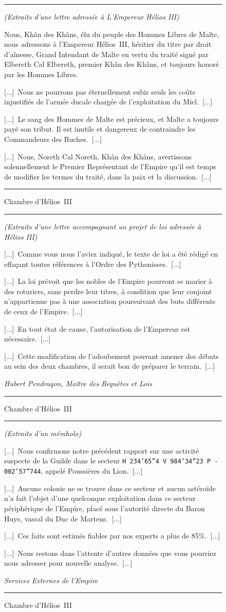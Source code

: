 \documentclass{article}
\newcommand{\indice}[4]{
    \begin{figure}[H]
        \begin{center}
            \rule{0.5\textwidth}{1pt}
        \end{center}
        \begin{framed}
            \begin{samepage}
                \textit{#1}
                \nopagebreak

                #2

                \nopagebreak

                \hfill\textit{#3}
            \end{samepage}
        \end{framed}
        \caption{#4}
        \begin{center}
            \rule{0.5\textwidth}{1pt}
        \end{center}
    \end{figure}
}
\begin{document}
\indice
{(Extraits d'une lettre adressée à L'Empereur Hélios III)}
{Nous, Khân des Khâns, élu du peuple des Hommes Libres de Malte, nous adressons
à l'Empereur Hélios~III, héritier du titre par droit d'aînesse, Grand Intendant
de Malte en vertu du traité signé par Elbereth Cal Elbereth, premier Khân des
Khâns, et toujours honoré par les Hommes Libres.

\nobreak

[...]~Nous ne pourrons pas éternellement subir seuls les coûts injustifiés de
l'armée ducale chargée de l'exploitation du Miel.~[...]

\nobreak

[...]~Le sang des Hommes de Malte est précieux, et Malte a toujours payé son
tribut. Il est inutile et dangereux de contraindre les Commandeurs des
Ruches.~[...]

\nobreak

[...]~Nous, Noreth Cal Noreth, Khân des Khâns, avertissons solennellement le
Premier Représentant de l'Empire qu'il est temps de modifier les termes du
traité, dans la paix et la discussion.~[...]}
{}
{Chambre d'Hélios~III}

\indice
{(Extraits d'une lettre accompagnant un projet de loi adressée à Hélios III)}
{[...]~Comme vous nous l'aviez indiqué, le texte de loi a été rédigé en
    effaçant toutes références à l'Ordre des Pythonisses.~[...]

\nobreak

[...]~La loi prévoit que les nobles de l'Empire pourront se marier à des
roturiers, sans perdre leur titres, à condition que leur conjoint
n'appartienne pas à une association poursuivant des buts différents de ceux de
l'Empire.~[...]

\nobreak

[...]~En tout état de cause, l'autorisation de l'Empereur est nécessaire.~[...]

\nobreak

[...]~Cette modification de l'adoubement pouvant amener des débats au sein des
deux chambres, il serait bon de préparer le terrain.~[...]}
{Hubert Pendragon, Maître des Requêtes et Lois}
{Chambre d'Hélios~III}

\indice
{(Extraits d'un mémholo)}
{[...]~Nous confirmons notre précédent rapport sur une activité suspecte de la
Guilde dans le secteur \mbox{\texttt{H 234'65''4 V 984'34''23 P -
002'57''744}}, appelé Poussières du Lion.~[...]

\nobreak

[...]~Aucune colonie ne se trouve dans ce secteur et aucun astéroïde n'a fait
l'objet d'une quelconque exploitation dans ce secteur périphérique de l'Empire,
placé sous l'autorité directe du Baron Huys, vassal du Duc de Martens.~[...]

\nobreak

[...]~Ces faits sont estimés fiables par nos experts a plus de 85\%.~[...]

\nobreak

[...]~Nous restons dans l'attente d'autres données que vous pourriez nous
adresser pour nouvelle analyse.~[...]} 
{Services Externes de l'Empire}
{Chambre d'Hélios~III}
\end{document}
